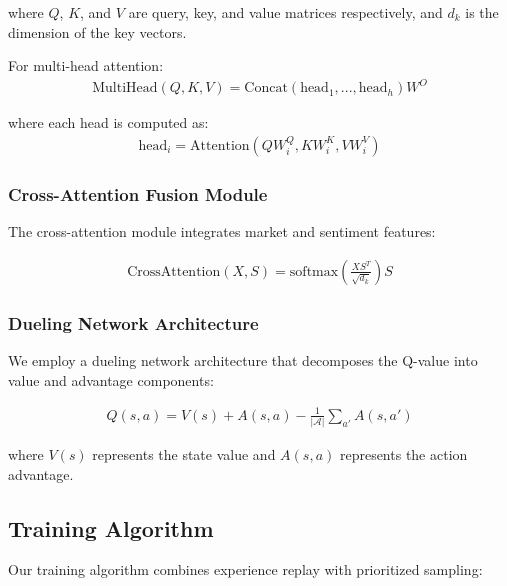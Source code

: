 \documentclass[11pt]{article}
\begin{document}
where $Q$, $K$, and $V$ are query, key, and value matrices respectively, and $d_k$ is the dimension of the key vectors.

For multi-head attention:
\begin{align}
    \text{MultiHead}(Q, K, V) = \text{Concat}(\text{head}_1, ..., \text{head}_h)W^O
\end{align}

where each head is computed as:
\begin{align}
    \text{head}_i = \text{Attention}(QW_i^Q, KW_i^K, VW_i^V)
\end{align}

\subsubsection{Cross-Attention Fusion Module}

The cross-attention module integrates market and sentiment features:

\begin{align}
    \text{CrossAttention}(X, S) = \text{softmax}\left(\frac{XS^T}{\sqrt{d_k}}\right)S
\end{align}

\subsubsection{Dueling Network Architecture}

We employ a dueling network architecture that decomposes the Q-value into value and advantage components:

\begin{align}
    Q(s, a) = V(s) + A(s, a) - \frac{1}{|\mathcal{A}|}\sum_{a'} A(s, a')
\end{align}

where $V(s)$ represents the state value and $A(s, a)$ represents the action advantage.

\subsection{Training Algorithm}

Our training algorithm combines experience replay with prioritized sampling:
\end{document}
